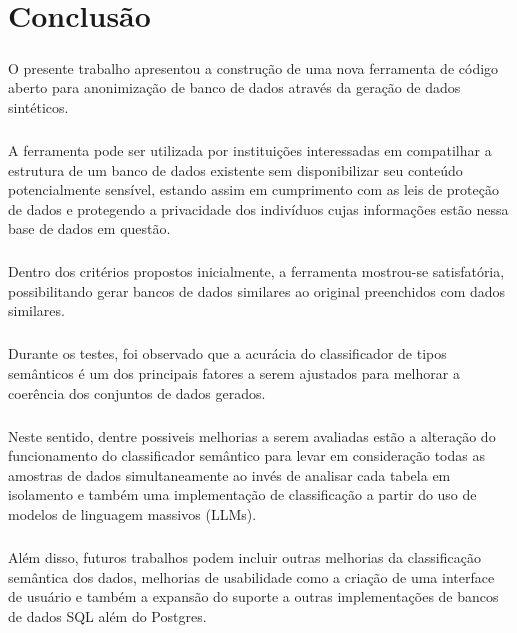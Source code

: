\chapter{Conclusão}
\label{cap6}

\paragraph{} O presente trabalho apresentou a construção de uma nova ferramenta de código aberto para anonimização de banco de dados através da geração de dados sintéticos.

\paragraph{} A ferramenta pode ser utilizada por instituições interessadas em compatilhar a estrutura de um banco de dados existente sem disponibilizar seu conteúdo potencialmente sensível, estando assim em cumprimento com as leis de proteção de dados e protegendo a privacidade dos indivíduos cujas informações estão nessa base de dados em questão.

\paragraph{} Dentro dos critérios propostos inicialmente, a ferramenta mostrou-se satisfatória, possibilitando gerar bancos de dados similares ao original preenchidos com dados similares.

\paragraph{} Durante os testes, foi observado que a acurácia do classificador de tipos semânticos é um dos principais fatores a serem ajustados para melhorar a coerência dos conjuntos de dados gerados.

\paragraph{} Neste sentido, dentre possiveis melhorias a serem avaliadas estão a alteração do funcionamento do classificador semântico para levar em consideração todas as amostras de dados simultaneamente ao invés de analisar cada tabela em isolamento e também uma implementação de classificação a partir do uso de modelos de linguagem massivos (LLMs).

\paragraph{} Além disso, futuros trabalhos podem incluir outras melhorias da classificação semântica dos dados, melhorias de usabilidade como a criação de uma interface de usuário e também a expansão do suporte a outras implementações de bancos de dados SQL além do Postgres.